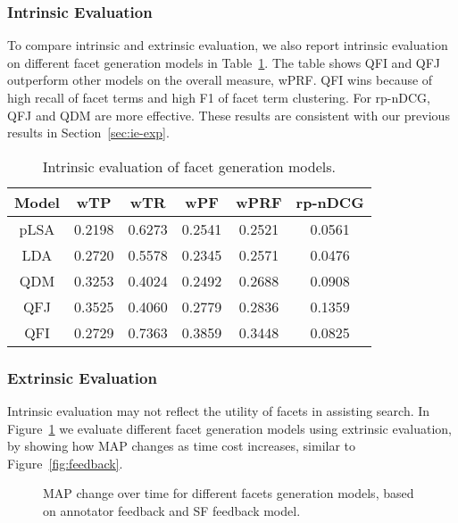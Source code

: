 \subsubsection{Intrinsic Evaluation}
To compare intrinsic and extrinsic evaluation, we also report intrinsic evaluation on different facet generation models in Table~\ref{tab:intrinsic}. The table shows QFI and QFJ  outperform other models on the overall measure, wPRF. QFI wins because of high recall of facet terms and high F1 of facet term clustering. For rp-nDCG, QFJ and QDM are more effective. These results are consistent with our previous results in Section~\ref{sec:ie-exp}.  
\begin{table}[!ht]
\centering
\caption{Intrinsic evaluation of facet generation models.}
\label{tab:intrinsic}
\begin{tabular}{|c|c|c|c|c|c|} \hline
Model & wTP & wTR & wPF & wPRF & rp-nDCG\\ \hline
pLSA & 0.2198 & 0.6273 & 0.2541 & 0.2521 & 0.0561\\ \hline
LDA & 0.2720 & 0.5578 & 0.2345 & 0.2571 & 0.0476\\ \hline
QDM & 0.3253 & 0.4024 & 0.2492 & 0.2688 & 0.0908\\ \hline
QFJ & 0.3525 & 0.4060 & 0.2779 & 0.2836 & 0.1359\\ \hline
QFI & 0.2729 & 0.7363 & 0.3859 & 0.3448 & 0.0825\\ \hline
\end{tabular}
\end{table}

\subsubsection{Extrinsic Evaluation} \label{sec:ee-cmp-facet-extrinsic}
Intrinsic evaluation may not reflect the utility of facets in assisting search. In Figure~\ref{fig:cmp-facet} we evaluate different facet generation models using extrinsic evaluation, by showing how MAP changes as time cost increases, similar to Figure~\ref{fig:feedback}.

\begin{figure}[!ht]
\centering
\caption{MAP change over time for different facets generation models, based on annotator feedback and SF feedback model.}
\label{fig:cmp-facet}
\end{figure}

